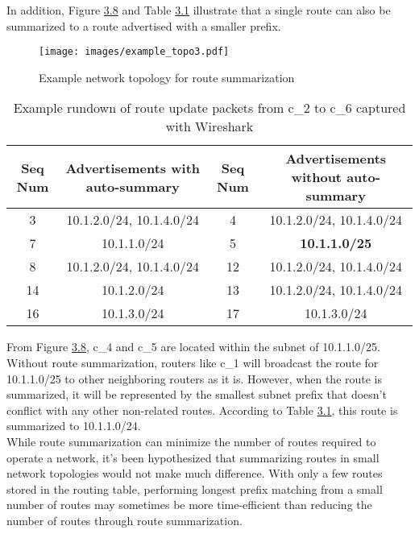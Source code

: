 \documentclass{uiucthesis2021}
\begin{document}
\noindent In addition, Figure \hyperref[f38]{3.8} and Table \hyperref[t31]{3.1} illustrate that a single route can also be summarized to a route advertised with a smaller prefix. 

\label{f38}
\begin{figure}[H]
\texttt{[image: images/example\_topo3.pdf]}
\centering
\caption{Example network topology for route summarization}
\centering
\end{figure}

\label{t31}
\begin{table}[!h]
\begin{center}
\begin{tabular}{||c|c|||c|c||} 
 \hline
 Seq Num & Advertisements \textbf{with} auto-summary & Seq Num & Advertisements \textbf{without} auto-summary\\
 \hline\hline
3 & 10.1.2.0/24, 10.1.4.0/24 & 4 & 10.1.2.0/24, 10.1.4.0/24\\
\hline
7 & 10.1.1.0/24 & 5 & \textbf{10.1.1.0/25}\\
\hline
8 & 10.1.2.0/24, 10.1.4.0/24 & 12 & 10.1.2.0/24, 10.1.4.0/24\\
\hline
14 & 10.1.2.0/24 & 13 & 10.1.2.0/24, 10.1.4.0/24\\
\hline
16 & 10.1.3.0/24 & 17 & 10.1.3.0/24\\ 
\hline
\end{tabular}
\caption{Example rundown of route update packets from c\_2 to c\_6 captured with Wireshark}
\end{center}
\end{table}

\noindent From Figure \hyperref[f38]{3.8}, c\_4 and c\_5 are located within the subnet of 10.1.1.0/25. Without route summarization, routers like c\_1 will broadcast the route for 10.1.1.0/25 to other neighboring routers as it is. However, when the route is summarized, it will be represented by the smallest subnet prefix that doesn't conflict with any other non-related routes. According to Table \hyperref[t31]{3.1}, this route is summarized to 10.1.1.0/24.\\

\noindent While route summarization can minimize the number of routes required to operate a network, it's been hypothesized that summarizing routes in small network topologies would not make much difference. With only a few routes stored in the routing table, performing longest prefix matching from a small number of routes may sometimes be more time-efficient than reducing the number of routes through route summarization.  
\end{document}
